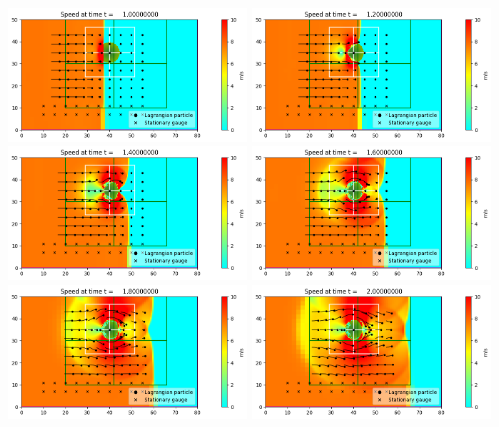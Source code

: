 \documentclass[11pt]{article}
\begin{document}
\vskip 10pt 
\includegraphics[width=0.475\textwidth]{frame0005fig0.png}
\vskip 10pt 
\includegraphics[width=0.475\textwidth]{frame0006fig0.png}
\vskip 10pt 
\includegraphics[width=0.475\textwidth]{frame0007fig0.png}
\vskip 10pt 
\includegraphics[width=0.475\textwidth]{frame0008fig0.png}
\vskip 10pt 
\includegraphics[width=0.475\textwidth]{frame0009fig0.png}
\vskip 10pt 
\includegraphics[width=0.475\textwidth]{frame0010fig0.png}
\end{document}
